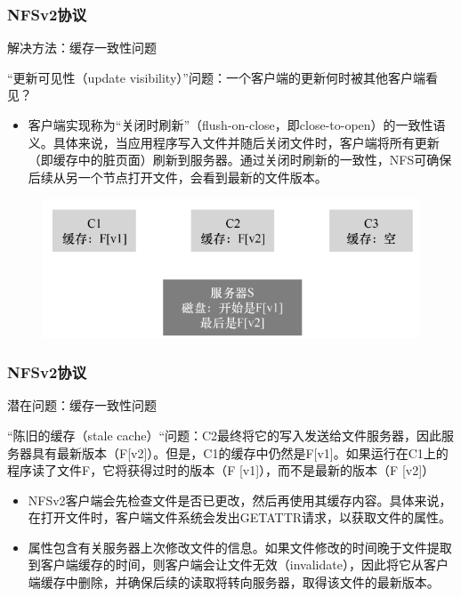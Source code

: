 \begin{frame}[fragile]
    \frametitle{NFSv2协议}
    解决方法：缓存一致性问题
    
    “更新可见性（update visibility）”问题：一个客户端的更新何时被其他客户端看见？
    \begin{itemize}
        \item 客户端实现称为“关闭时刷新”（flush-on-close，即close-to-open）的一致性语义。具体来说，当应用程序写入文件并随后关闭文件时，客户端将所有更新（即缓存中的脏页面）刷新到服务器。通过关闭时刷新的一致性，NFS可确保后续从另一个节点打开文件，会看到最新的文件版本。
    \end{itemize}
    
    \begin{figure}
        \includegraphics[width=0.5\linewidth]{figs/nfsv2-cache.png}
    \end{figure}
    
\end{frame}

\begin{frame}[fragile]
    \frametitle{NFSv2协议}
    潜在问题：缓存一致性问题
    
    “陈旧的缓存（stale cache）“问题：C2最终将它的写入发送给文件服务器，因此服务器具有最新版本（F[v2]）。但是，C1的缓存中仍然是F[v1]。如果运行在C1上的程序读了文件F，它将获得过时的版本（F [v1]），而不是最新的版本（F [v2]）
    \begin{itemize}
        \item NFSv2客户端会先检查文件是否已更改，然后再使用其缓存内容。具体来说，在打开文件时，客户端文件系统会发出GETATTR请求，以获取文件的属性。
        \item 属性包含有关服务器上次修改文件的信息。如果文件修改的时间晚于文件提取到客户端缓存的时间，则客户端会让文件无效（invalidate），因此将它从客户端缓存中删除，并确保后续的读取将转向服务器，取得该文件的最新版本。
    \end{itemize}
    
    
\end{frame}


